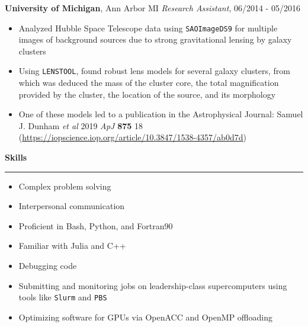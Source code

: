 \documentclass[10pt]{article}
\begin{document}
\textbf{University of Michigan}, Ann Arbor MI\newline
\textit{Research Assistant}, 06/2014 - 05/2016
\begin{itemize}\setlength\itemsep{0.1cm}
  \item
    Analyzed Hubble Space Telescope data using \texttt{SAOImageDS9}
    for multiple images of
    background sources due to strong gravitational lensing by galaxy clusters
  \item
    Using \texttt{LENSTOOL},
    found robust lens models for several galaxy clusters,
    from which was deduced the mass of the cluster core,
    the total magnification provided by the cluster,
    the location of the source, and its morphology
  \item
    One of these models led to a publication in the Astrophysical Journal:
    Samuel J. Dunham \textit{et al} 2019 \textit{ApJ} \textbf{875} 18
    (\url{https://iopscience.iop.org/article/10.3847/1538-4357/ab0d7d})
\end{itemize}
\vspace{1em}

\textbf{Skills}\vspace{0.5em}\hrule

\begin{itemize}\setlength\itemsep{0.1cm}
  \item
    Complex problem solving
  \item
    Interpersonal communication
  \item
    Proficient in Bash, Python, and Fortran90
  \item
    Familiar with Julia and C++
  \item
    Debugging code
  \item
    Submitting and monitoring jobs
    on leadership-class supercomputers using tools like \texttt{Slurm}
    and \texttt{PBS}
  \item
    Optimizing software for GPUs via OpenACC and OpenMP offloading
\end{itemize}
\end{document}
